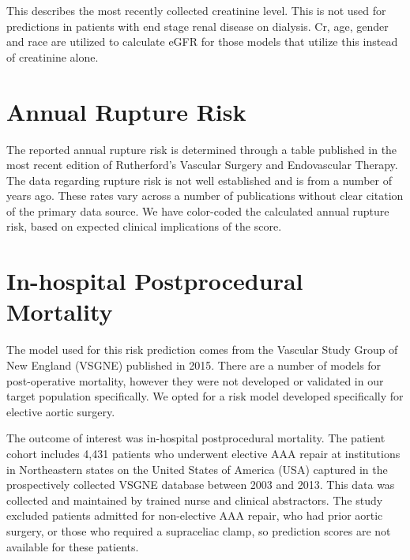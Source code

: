 \documentclass[
]{book}
\begin{document}
This describes the most recently collected creatinine level. This is not used for predictions in patients with end stage renal disease on dialysis. Cr, age, gender and race are utilized to calculate eGFR for those models that utilize this instead of creatinine alone.

\hypertarget{annual-rupture-risk}{%
\section{Annual Rupture Risk}\label{annual-rupture-risk}}

The reported annual rupture risk is determined through a table published in the most recent edition of Rutherford's Vascular Surgery and Endovascular Therapy. \citet{tracciAortoiliacAneurysmsEvaluation} The data regarding rupture risk is not well established and is from a number of years ago. These rates vary across a number of publications without clear citation of the primary data source. We have color-coded the calculated annual rupture risk, based on expected clinical implications of the score.

\hypertarget{in-hospital-postprocedural-mortality}{%
\section{In-hospital Postprocedural Mortality}\label{in-hospital-postprocedural-mortality}}

The model used for this risk prediction comes from the Vascular Study Group of New England (VSGNE) published in 2015. \citet{eslami2015} There are a number of models for post-operative mortality, however they were not developed or validated in our target population specifically.\citep{meguidSurgicalRiskPreoperative2016d, meguidSurgicalRiskPreoperative2016c, meguidSurgicalRiskPreoperative2016e} We opted for a risk model developed specifically for elective aortic surgery.

The outcome of interest was in-hospital postprocedural mortality. The patient cohort includes 4,431 patients who underwent elective AAA repair at institutions in Northeastern states on the United States of America (USA) captured in the prospectively collected VSGNE database between 2003 and 2013. This data was collected and maintained by trained nurse and clinical abstractors. The study excluded patients admitted for non-elective AAA repair, who had prior aortic surgery, or those who required a supraceliac clamp, so prediction scores are not available for these patients.
\end{document}
